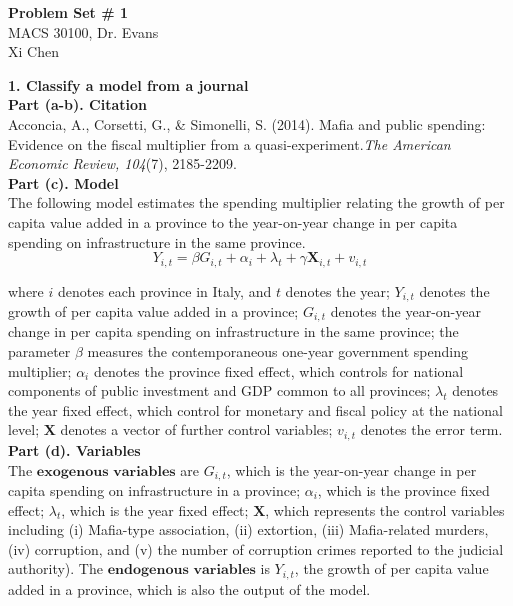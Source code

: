 \documentclass[letterpaper,12pt]{article}
\theoremstyle{definition}
\begin{document}
\begin{flushleft}
  \textbf{\large{Problem Set \# 1}} \\
  MACS 30100, Dr. Evans \\
  Xi Chen
\end{flushleft}

\vspace{5mm}

\noindent\textbf{1. Classify a model from a journal} \\

\textbf{Part (a-b). Citation} \\

Acconcia, A., Corsetti, G., \& Simonelli, S. (2014). Mafia and public spending: Evidence on the fiscal multiplier from a quasi-experiment.\emph{The American Economic Review, 104}(7), 2185-2209.\\

\textbf{Part (c). Model} \\

The following model estimates the spending multiplier relating the growth of per capita value added in a province to the year-on-year change in per capita spending on infrastructure in the same province. 
\begin{equation*}
  Y_{i,t} = \beta G_{i,t} + \alpha_{i} + \lambda_{t} + \gamma \mathbf{X}_{i,t} + v_{i,t} 
\end{equation*}

where $i$ denotes each province in Italy, and $t$ denotes the year;  $Y_{i,t}$ denotes the growth of per capita value added in a province; $G_{i,t}$ denotes the year-on-year change in per capita spending on infrastructure in the same province; the parameter $\beta$ measures the contemporaneous one-year government spending multiplier; $\alpha_{i}$ denotes the province fixed effect, which controls for national components of public investment and GDP common to all provinces; $\lambda_{t}$ denotes the year fixed effect, which control for monetary and fiscal policy at the national level; $\mathbf{X}$ denotes a vector of further control variables; $v_{i,t}$ denotes the error term. \\


\textbf{Part (d). Variables} \\

The $\mathbf{exogenous}$ $\mathbf{variables}$ are $G_{i,t}$, which is the year-on-year change in per capita spending on infrastructure in a province; $\alpha_{i}$, which is the province fixed effect; $\lambda_{t}$, which is the year fixed effect; $\mathbf{X}$, which represents the control variables including (i) Mafia-type association, (ii) extortion, (iii) Mafia-related murders, (iv) corruption, and (v) the number of corruption crimes reported to the judicial authority). The $\mathbf{endogenous}$ $\mathbf{variables}$ is $Y_{i,t}$, the growth of per capita value added in a province, which is also the output of the model.  \\
\end{document}
